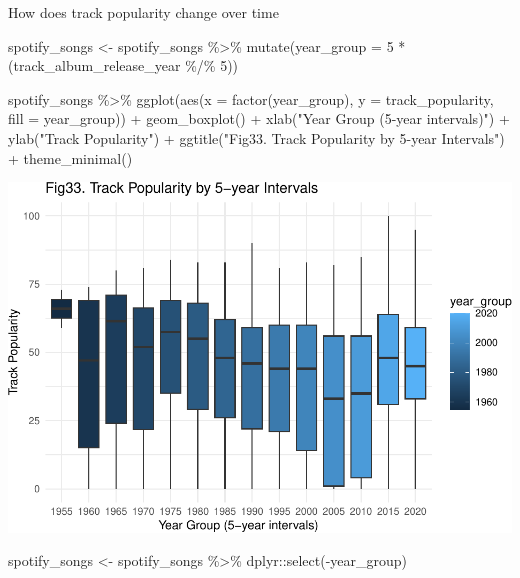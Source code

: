 \documentclass[
]{article}
\newenvironment{Shaded}{\begin{snugshade}}{\end{snugshade}}
\newcommand{\AttributeTok}[1]{\textcolor[rgb]{0.77,0.63,0.00}{#1}}
\newcommand{\DecValTok}[1]{\textcolor[rgb]{0.00,0.00,0.81}{#1}}
\newcommand{\FunctionTok}[1]{\textcolor[rgb]{0.00,0.00,0.00}{#1}}
\newcommand{\NormalTok}[1]{#1}
\newcommand{\OtherTok}[1]{\textcolor[rgb]{0.56,0.35,0.01}{#1}}
\newcommand{\SpecialCharTok}[1]{\textcolor[rgb]{0.00,0.00,0.00}{#1}}
\newcommand{\StringTok}[1]{\textcolor[rgb]{0.31,0.60,0.02}{#1}}
\begin{document}
How does track popularity change over time

\begin{Shaded}
\begin{Highlighting}[]
\NormalTok{spotify\_songs }\OtherTok{\textless{}{-}}\NormalTok{ spotify\_songs }\SpecialCharTok{\%\textgreater{}\%}
  \FunctionTok{mutate}\NormalTok{(}\AttributeTok{year\_group =} \DecValTok{5} \SpecialCharTok{*}\NormalTok{ (track\_album\_release\_year }\SpecialCharTok{\%/\%} \DecValTok{5}\NormalTok{))}

\NormalTok{spotify\_songs }\SpecialCharTok{\%\textgreater{}\%}
  \FunctionTok{ggplot}\NormalTok{(}\FunctionTok{aes}\NormalTok{(}\AttributeTok{x =} \FunctionTok{factor}\NormalTok{(year\_group), }
             \AttributeTok{y =}\NormalTok{ track\_popularity,}
             \AttributeTok{fill =}\NormalTok{ year\_group)) }\SpecialCharTok{+}
  \FunctionTok{geom\_boxplot}\NormalTok{() }\SpecialCharTok{+}
  \FunctionTok{xlab}\NormalTok{(}\StringTok{"Year Group (5{-}year intervals)"}\NormalTok{) }\SpecialCharTok{+}
  \FunctionTok{ylab}\NormalTok{(}\StringTok{"Track Popularity"}\NormalTok{) }\SpecialCharTok{+}
  \FunctionTok{ggtitle}\NormalTok{(}\StringTok{"Fig33. Track Popularity by 5{-}year Intervals"}\NormalTok{) }\SpecialCharTok{+}
  \FunctionTok{theme\_minimal}\NormalTok{()}
\end{Highlighting}
\end{Shaded}

\includegraphics{Final-Report_files/figure-latex/unnamed-chunk-15-1.pdf}

\begin{Shaded}
\begin{Highlighting}[]
\NormalTok{spotify\_songs }\OtherTok{\textless{}{-}}\NormalTok{ spotify\_songs }\SpecialCharTok{\%\textgreater{}\%} 
\NormalTok{  dplyr}\SpecialCharTok{::}\FunctionTok{select}\NormalTok{(}\SpecialCharTok{{-}}\NormalTok{year\_group)}
\end{Highlighting}
\end{Shaded}
\end{document}
